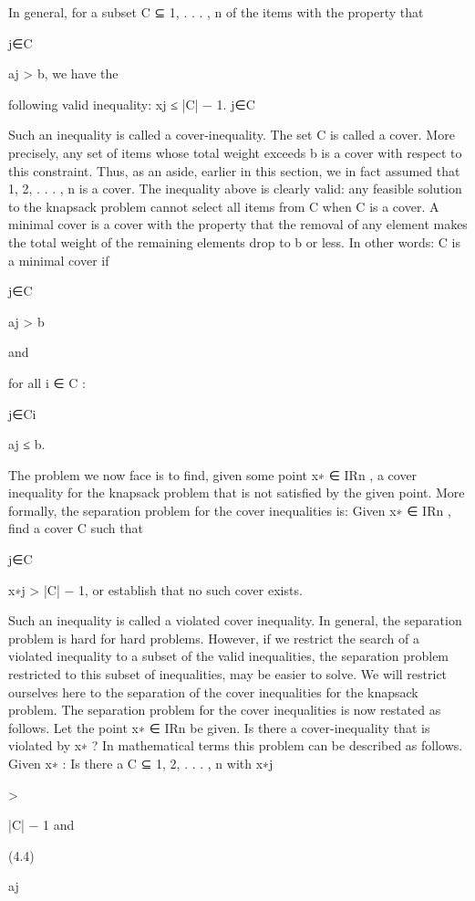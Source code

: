 In general, for a subset C ⊆ {1, . . . , n} of the items with the property that

j∈C

aj > b, we have the

following valid inequality:
xj ≤ |C| − 1.
j∈C

Such an inequality is called a cover-inequality. The set C is called a cover. More precisely, any set of
items whose total weight exceeds b is a cover with respect to this constraint. Thus, as an aside, earlier in
this section, we in fact assumed that {1, 2, . . . , n} is a cover. The inequality above is clearly valid: any
feasible solution to the knapsack problem cannot select all items from C when C is a cover. A minimal
cover is a cover with the property that the removal of any element makes the total weight of the remaining
elements drop to b or less. In other words: C is a minimal cover if

j∈C

aj > b

and

for all i ∈ C :

j∈C{i}

aj ≤ b.

The problem we now face is to find, given some point x∗ ∈ IRn , a cover inequality for the knapsack
problem that is not satisfied by the given point. More formally, the separation problem for the cover
inequalities is:
Given x∗ ∈ IRn , find a cover C such that

j∈C

x∗j > |C| − 1, or establish that no such cover exists.

Such an inequality is called a violated cover inequality. In general, the separation problem is hard for hard
problems. However, if we restrict the search of a violated inequality to a subset of the valid inequalities,
the separation problem restricted to this subset of inequalities, may be easier to solve. We will restrict
ourselves here to the separation of the cover inequalities for the knapsack problem.
The separation problem for the cover inequalities is now restated as follows. Let the point x∗ ∈ IRn be
given. Is there a cover-inequality that is violated by x∗ ? In mathematical terms this problem can be
described as follows.
Given x∗ : Is there a C ⊆ {1, 2, . . . , n} with
x∗j

>

|C| − 1 and

(4.4)

aj


